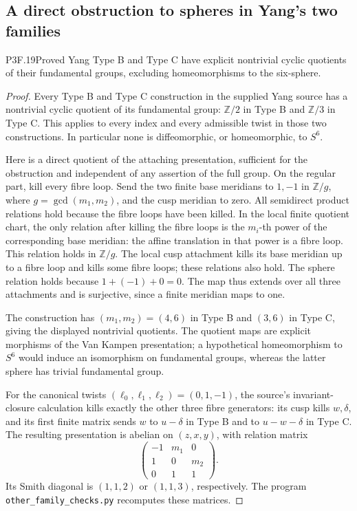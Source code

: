 \subsection{A direct obstruction to spheres in Yang's two families}
\begin{statement}{P3F.19}{Proved}
Yang Type B and Type C have explicit nontrivial cyclic quotients of their fundamental groups, excluding homeomorphisms to the six-sphere.
\end{statement}
\begin{proof}
Every Type B and Type C construction in the supplied Yang source has a nontrivial cyclic quotient of its fundamental group: \(\mathbb Z/2\) in Type B and \(\mathbb Z/3\) in Type C. This applies to every index and every admissible twist in those two constructions. In particular none is diffeomorphic, or homeomorphic, to \(S^6\).

Here is a direct quotient of the attaching presentation, sufficient for the obstruction and independent of any assertion of the full group. On the regular part, kill every fibre loop. Send the two finite base meridians to \(1,-1\) in \(\mathbb Z/g\), where \(g=\gcd(m_1,m_2)\), and the cusp meridian to zero. All semidirect product relations hold because the fibre loops have been killed. In the local finite quotient chart, the only relation after killing the fibre loops is the \(m_i\)-th power of the corresponding base meridian: the affine translation in that power is a fibre loop. This relation holds in \(\mathbb Z/g\). The local cusp attachment kills its base meridian up to a fibre loop and kills some fibre loops; these relations also hold. The sphere relation holds because \(1+(-1)+0=0\). The map thus extends over all three attachments and is surjective, since a finite meridian maps to one.

The construction has \((m_1,m_2)=(4,6)\) in Type B and \((3,6)\) in Type C, giving the displayed nontrivial quotients. The quotient maps are explicit morphisms of the Van Kampen presentation; a hypothetical homeomorphism to \(S^6\) would induce an isomorphism on fundamental groups, whereas the latter sphere has trivial fundamental group.

For the canonical twists \((\ell_0,\ell_1,\ell_2)=(0,1,-1)\), the source's invariant-closure calculation kills exactly the other three fibre generators: its cusp kills \(w,\delta\), and its first finite matrix sends \(w\) to \(u-\delta\) in Type B and to \(u-w-\delta\) in Type C. The resulting presentation is abelian on \((z,x,y)\), with relation matrix \[
 \begin{pmatrix}-1&m_1&0\\1&0&m_2\\0&1&1\end{pmatrix}.
\] Its Smith diagonal is \((1,1,2)\) or \((1,1,3)\), respectively. The program \texttt{other\_family\_checks.py} recomputes these matrices.
\end{proof}

